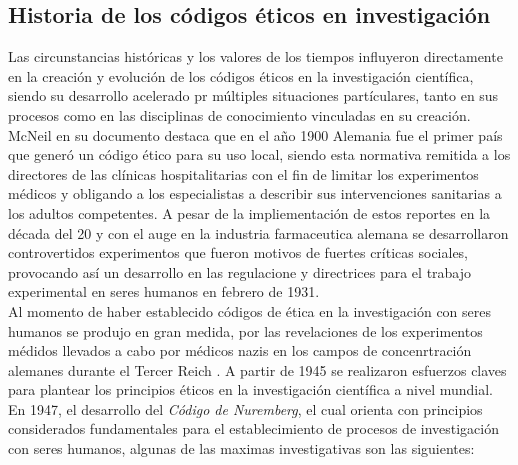 \subsection{Historia de los códigos éticos en investigación}
Las circunstancias históricas y los valores de los tiempos influyeron directamente en la creación y evolución 
de los códigos éticos en la investigación científica, siendo su desarrollo acelerado pr múltiples situaciones partículares, 
tanto en sus procesos como en las disciplinas de conocimiento vinculadas en su creación. McNeil en su documento \cite{McInerney2001} destaca 
que en el año 1900 Alemania fue el primer país que generó un código ético para su uso local, siendo esta normativa remitida
a los directores de las clínicas hospitalitarias con el fin de limitar los experimentos médicos y obligando a los especialistas 
a describir sus intervenciones sanitarias a los adultos competentes. A pesar de la impliementación de estos reportes en la década 
del 20 y con el auge en la industria farmaceutica alemana se desarrollaron controvertidos experimentos que fueron motivos de fuertes 
críticas sociales, provocando así un desarrollo en las regulacione y directrices para el trabajo experimental en seres humanos 
en febrero de 1931.\\
Al momento de haber establecido códigos de ética en la investigación con seres humanos se produjo en gran medida, por las revelaciones de 
los experimentos médidos llevados a cabo por médicos nazis en los campos de concenrtración alemanes durante el Tercer Reich \cite{Schuklenk2000}. 
A partir de 1945 se realizaron esfuerzos claves para plantear los principios éticos en la investigación científica a nivel mundial. En 1947, el desarrollo
del \textit{Código de Nuremberg}, el cual orienta con principios considerados fundamentales para el establecimiento de procesos de investigación
con seres humanos, algunas de las maximas investigativas son las siguientes\cite{NurembergCode}:
